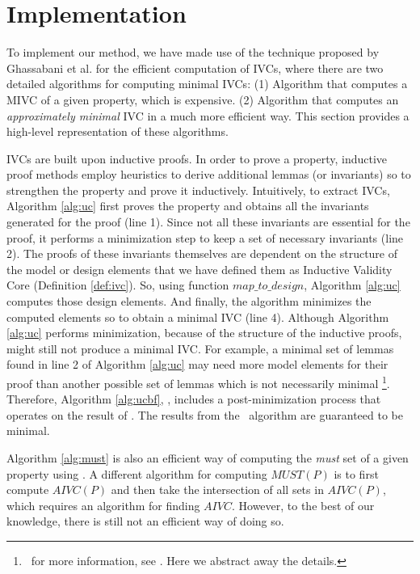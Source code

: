 \section{Implementation}
\label{sec:impl}

To implement our method, we have made use of the technique proposed by Ghassabani et al. \cite{Ghass16} for the efficient computation of IVCs, where there are two detailed algorithms for computing minimal IVCs: (1) Algorithm \ucbfalg that computes a MIVC of a given property, which is expensive. (2) Algorithm \ucalg that computes an \emph{approximately minimal} IVC in a much more efficient way. This section provides a high-level representation of these algorithms.

IVCs are built upon inductive proofs. In order to prove a property, inductive proof methods employ heuristics to derive additional lemmas (or invariants) so to strengthen the property and prove it inductively. Intuitively, to extract IVCs, Algorithm \ref{alg:uc}
first proves the property and obtains all the invariants generated for the proof (line 1). Since not all these invariants are essential for the proof, it performs a minimization step to keep a set of necessary invariants (line 2). The proofs of these invariants themselves are dependent on the structure of the model or design elements that we have defined them as Inductive Validity Core (Definition \ref{def:ivc}).
So, using function $map\_to\_design$, Algorithm \ref{alg:uc}
computes those design elements. And finally, the algorithm minimizes the computed elements so to obtain a minimal IVC (line 4). Although Algorithm \ref{alg:uc} performs minimization, because of the structure of the inductive proofs, \ucalg might still not produce a minimal IVC. For example, a minimal set of lemmas found in line 2 of Algorithm \ref{alg:uc} may need more model elements for their proof than another possible set of lemmas which is not necessarily minimal \footnote{\noindent ~for more information, see \cite{Ghass16}. Here we abstract away the details.}.
Therefore, Algorithm \ref{alg:ucbf}, \ucbfalg, includes a post-minimization process that
operates on the result of \ucalg. The results from the \ucbfalg\ algorithm are guaranteed to be minimal.

Algorithm \ref{alg:must} is also an efficient way of computing the \emph{must} set of a given property using \ucalg. A different algorithm for computing $MUST (P)$ is to first compute $AIVC (P)$ and then take the intersection of all sets in $AIVC (P)$, which requires an algorithm for finding $AIVC$. 
However, to the best of our knowledge, there is still not an efficient way of doing so. 

